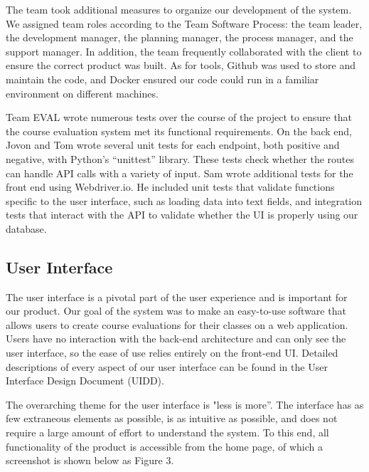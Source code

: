 \documentclass{article}
\begin{document}
The team took additional measures to organize our development of the system. We assigned team roles according to the Team Software Process: the team leader, the development manager, the planning manager, the process manager, and the support manager. In addition, the team frequently collaborated with the client to ensure the correct product was built. As for tools, Github was used to store and maintain the code, and Docker ensured our code could run in a familiar environment on different machines.

Team EVAL wrote numerous tests over the course of the project to ensure that the course evaluation system met its functional requirements. On the back end, Jovon and Tom wrote several unit tests for each endpoint, both positive and negative, with Python's ``unittest'' library. These tests check whether the routes can handle API calls with a variety of input. Sam wrote additional tests for the front end using Webdriver.io. He included unit tests that validate functions specific to the user interface, such as loading data into text fields, and integration tests that interact with the API to validate whether the UI is properly using our database.

\subsection{User Interface}

The user interface is a pivotal part of the user experience and is important for our product. Our goal of the system was to make an easy-to-use software that allows users to create course evaluations for their classes on a web application. Users have no interaction with the back-end architecture and can only see the user interface, so the ease of use relies entirely on the front-end UI. Detailed descriptions of every aspect of our user interface can be found in the User Interface Design Document (UIDD). 

The overarching theme for the user interface is "less is more''.  The interface has as few extraneous elements as possible, is as intuitive as possible, and does not require a large amount of effort to understand the system. To this end, all functionality of the product is accessible from the home page, of which a screenshot is shown below as Figure 3.
\end{document}
